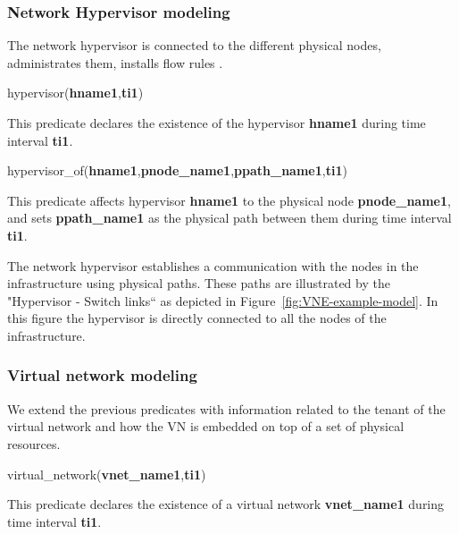 







\subsubsection{Network Hypervisor modeling}
The network hypervisor is connected to the different physical nodes, administrates them, installs flow rules \etc.

hypervisor(\textbf{hname1},\textbf{ti1})

This predicate declares the existence of the hypervisor \textbf{hname1} during time interval \textbf{ti1}.

hypervisor\_of(\textbf{hname1},\textbf{pnode\_name1},\textbf{ppath\_name1},\textbf{ti1})

This predicate affects hypervisor \textbf{hname1} to the physical node \textbf{pnode\_name1}, and sets \textbf{ppath\_name1} as the physical path between them during time interval \textbf{ti1}.

The network hypervisor establishes a communication with the nodes in the infrastructure using physical paths.
These paths are illustrated by the "Hypervisor - Switch links`` as depicted in Figure~\ref{fig:VNE-example-model}.
In this figure the hypervisor is directly connected to all the nodes of the infrastructure.



\subsubsection{Virtual network modeling}
We extend the previous predicates with information related to the tenant of the virtual network and how the VN is embedded on top of a set of physical resources.

virtual\_network(\textbf{vnet\_name1},\textbf{ti1})

This predicate declares the existence of a virtual network \textbf{vnet\_name1} during time interval \textbf{ti1}.

